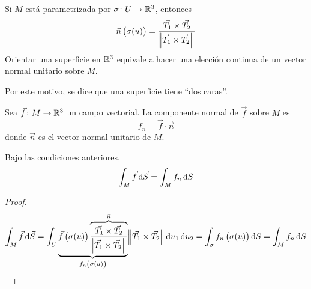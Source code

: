\begin{obs}
    Si $M$ está parametrizada por $\sigma \colon U \to \mathbb{R}^3$, entonces
    \[
        \vec{n} \left( \sigma(u) \right) = \frac{\vec{T_1} \times \vec{T_2}}{\norm{\vec{T_1} \times \vec{T_2}}}
    \]
    Orientar una superficie en $\mathbb{R}^3$ equivale a hacer una elección continua de un vector normal unitario sobre $M$.

    Por este motivo, se dice que una superficie tiene ``dos caras''.
\end{obs}

\begin{defi}
    Sea $\vec{f} \colon M \to \mathbb{R}^3$ un campo vectorial. La componente normal de $\vec{f}$ sobre $M$ es 
    \[
        f_n = \vec{f} \cdot \vec{n}
    \]
    donde $\vec{n}$ es el vector normal unitario de $M$.
\end{defi}

\begin{prop}
    Bajo las condiciones anteriores,
    \[
        \int_M \vec{f} \dif \vec{S} = \int_M f_n \dif S
    \]
\end{prop}

\begin{proof}
    \[
        \int_M \vec{f} \dif \vec{S} = \int_U \underbrace{\vec{f}\left( \sigma(u) \right) \overbrace{\frac{\vec{T_1} \times \vec{T_2}}{\norm{\vec{T_1} \times \vec{T_2}}}}^
        {\vec{n}}}_{f_n\left( \sigma(u) \right)} \norm{\vec{T_1} \times \vec{T_2}} \dif u_1 \dif u_2 = \int_\sigma f_n\left( \sigma(u) \right) \dif S =
        \int_M f_n \dif S
    \]
\end{proof}

